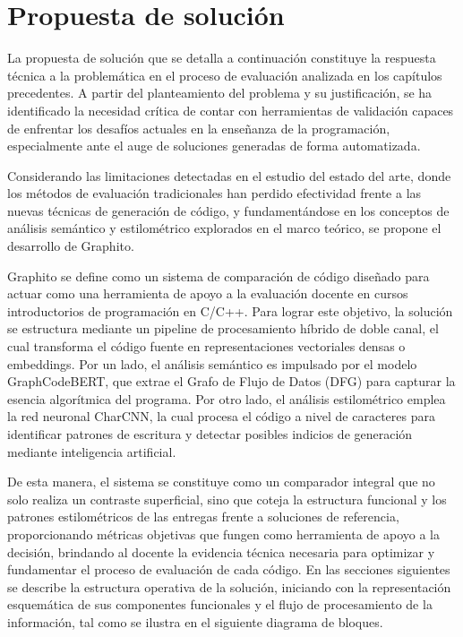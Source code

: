 \chapter{Propuesta de solución}
La propuesta de solución que se detalla a continuación constituye la respuesta técnica a la problemática en el proceso de evaluación analizada en los capítulos precedentes. A partir del planteamiento del problema y su justificación, se ha identificado la necesidad crítica de contar con herramientas de validación capaces de enfrentar los desafíos actuales en la enseñanza de la programación, especialmente ante el auge de soluciones generadas de forma automatizada.

Considerando las limitaciones detectadas en el estudio del estado del arte, donde los métodos de evaluación tradicionales han perdido efectividad frente a las nuevas técnicas de generación de código, y fundamentándose en los conceptos de análisis semántico y estilométrico explorados en el marco teórico, se propone el desarrollo de Graphito.

Graphito se define como un sistema de comparación de código diseñado para actuar como una herramienta de apoyo a la evaluación docente en cursos introductorios de programación en C/C++. Para lograr este objetivo, la solución se estructura mediante un pipeline de procesamiento híbrido de doble canal, el cual transforma el código fuente en representaciones vectoriales densas o embeddings. Por un lado, el análisis semántico es impulsado por el modelo GraphCodeBERT, que extrae el Grafo de Flujo de Datos (DFG) para capturar la esencia algorítmica del programa. Por otro lado, el análisis estilométrico emplea la red neuronal CharCNN, la cual procesa el código a nivel de caracteres para identificar patrones de escritura y detectar posibles indicios de generación mediante inteligencia artificial.

De esta manera, el sistema se constituye como un comparador integral que no solo realiza un contraste superficial, sino que coteja la estructura funcional y los patrones estilométricos de las entregas frente a soluciones de referencia, proporcionando métricas objetivas que fungen como herramienta de apoyo a la decisión, brindando al docente la evidencia técnica necesaria para optimizar y fundamentar el proceso de evaluación de cada código. En las secciones siguientes se describe la estructura operativa de la solución, iniciando con la representación esquemática de sus componentes funcionales y el flujo de procesamiento de la información, tal como se ilustra en el siguiente diagrama de bloques.

